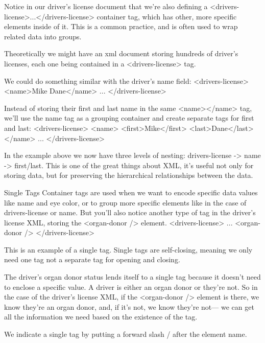         Notice in our driver’s license document that we’re also defining a <drivers-license>...</drivers-license> container tag, which has other, more specific elements inside of it. This is a common practice, and is often used to wrap related data into groups.

        Theoretically we might have an xml document storing hundreds of driver’s licenses, each one being contained in a <drivers-license> tag.

        We could do something similar with the driver’s name field:
            <drivers-license>
                <name>Mike Dane</name>
                ...
            </drivers-license>

        Instead of storing their first and last name in the same <name></name> tag, we’ll use the name tag as a grouping container and create separate tags for first and last:
            <drivers-license>
                <name>
                    <first>Mike</first>
                    <last>Dane</last>
                </name>
                ...
            </drivers-license>

        In the example above we now have three levels of nesting: drivers-license -> name -> first/last. This is one of the great things about XML, it’s useful not only for storing data, but for preserving the hierarchical relationships between the data.

    Single Tags
        Container tags are used when we want to encode specific data values like name and eye color, or to group more specific elements like in the case of drivers-license or name. But you’ll also notice another type of tag in the driver’s license XML, storing the <organ-donor /> element.
            <drivers-license>
                ...
                <organ-donor />
            </drivers-license>

        This is an example of a single tag. Single tags are self-closing, meaning we only need one tag not a separate tag for opening and closing.

        The driver’s organ donor status lends itself to a single tag because it doesn’t need to enclose a specific value. A driver is either an organ donor or they’re not. So in the case of the driver’s license XML, if the <organ-donor /> element is there, we know they’re an organ donor, and, if it’s not, we know they’re not— we can get all the information we need based on the existence of the tag.

        We indicate a single tag by putting a forward slash / after the element name.

